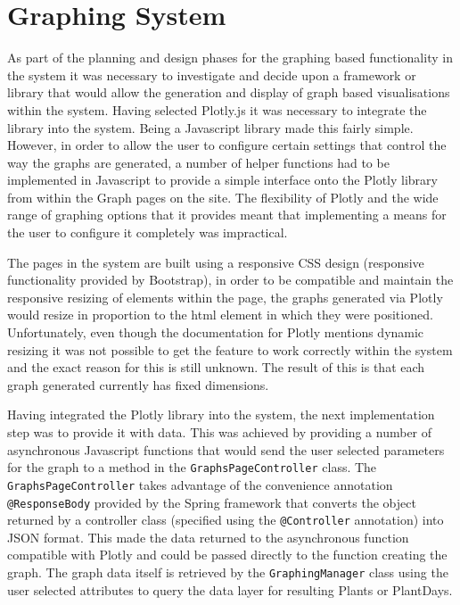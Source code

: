 \section{Graphing System}
As part of the planning and design phases for the graphing based functionality in the system it was necessary to investigate and decide upon a framework or library that would allow the generation and display of graph based visualisations within the system. Having selected Plotly.js it was necessary to integrate the library into the system. Being a Javascript library made this fairly simple. However, in order to allow the user to configure certain settings that control the way the graphs are generated, a number of helper functions had to be implemented in Javascript to provide a simple interface onto the Plotly library from within the Graph pages on the site. The flexibility of Plotly and the wide range of graphing options that it provides meant that implementing a means for the user to configure it completely was impractical. 

The pages in the system are built using a responsive CSS design (responsive functionality provided by Bootstrap), in order to be compatible and maintain the responsive resizing of elements within the page, the graphs generated via Plotly would resize in proportion to the html element in which they were positioned. Unfortunately, even though the documentation for Plotly mentions dynamic resizing it was not possible to get the feature to work correctly within the system and the exact reason for this is still unknown. The result of this is that each graph generated currently has fixed dimensions. 

Having integrated the Plotly library into the system, the next implementation step was to provide it with data. This was achieved by providing a number of asynchronous Javascript functions that would send the user selected parameters for the graph to a method in the \texttt{GraphsPageController} class. The \texttt{GraphsPageController} takes advantage of the convenience annotation \texttt{@ResponseBody} provided by the Spring framework that converts the object returned by a controller class (specified using the \texttt{@Controller} annotation) 
into JSON format. This made the data returned to the asynchronous function compatible with Plotly and could be passed directly to the function creating the graph. The graph data itself is retrieved by the \texttt{GraphingManager} class using the user selected attributes to query the data layer for resulting Plants or PlantDays. 

